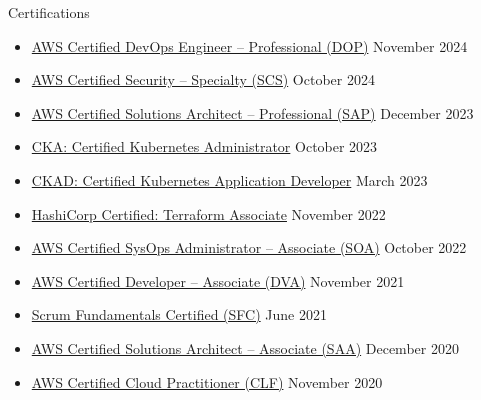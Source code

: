 \documentclass[a4paper]{article}
\newlength{\tabin}
\newlength{\secsep}
\newcommand{\lineunder}{\vspace*{-8pt}\\\hspace*{-6pt}\hrulefill\\\vspace*{-15pt}}
\newenvironment{tabbedsection}[1]{
  \begin{list}{}{
    \setlength{\itemsep}{0pt}
    \setlength{\labelsep}{0pt}
    \setlength{\labelwidth}{0pt}
    \setlength{\leftmargin}{\tabin}
    \setlength{\rightmargin}{\tabin}
    \setlength{\listparindent}{0pt}
    \setlength{\parsep}{0pt}
    \setlength{\parskip}{0pt}
    \setlength{\partopsep}{0pt}
    \setlength{\topsep}{#1}
  }
  \item[]
}{\end{list}}
\newenvironment{resume_section}[1]{
  \filbreak
  \vspace{2\secsep}
  \textsc{\large#1}
  \lineunder
  \begin{tabbedsection}{\secsep}
}{\end{tabbedsection}}
\newenvironment{subitems}{
  \renewcommand{\labelitemi}{-}
  \begin{itemize}
  \setlength{\labelsep}{1em}
}{\end{itemize}}
\begin{document}
\begin{resume_section}{Certifications}
  \begin{subitems}
    \item \href{https://www.credly.com/badges/8ccfcd37-58d8-4772-90a2-3d69231e4698}{AWS Certified DevOps Engineer -- Professional (DOP)} \hfill November 2024
    \item \href{https://www.credly.com/badges/d94cb58c-a9e4-44cd-80dd-2e551872609e}{AWS Certified Security -- Specialty (SCS)} \hfill October 2024
    \item \href{https://www.credly.com/badges/a3078ad1-cbc8-4726-9c7e-90731da1a1b7}{AWS Certified Solutions Architect -- Professional (SAP)} \hfill December 2023
    \item \href{https://www.credly.com/badges/0e2803d2-eb45-4143-ae3c-6d35009256be}{CKA: Certified Kubernetes Administrator} \hfill October 2023
    \item \href{https://www.credly.com/badges/4a65defc-6caa-46cc-bec3-2aed6984ab89}{CKAD: Certified Kubernetes Application Developer} \hfill March 2023
    \item \href{https://www.credly.com/badges/26043bb9-cca6-4c6c-80ae-51a4ef85da84}{HashiCorp Certified: Terraform Associate} \hfill November 2022
    \item \href{https://www.credly.com/badges/849a2bb2-2a38-46ad-9352-613da643d83a}{AWS Certified SysOps Administrator -- Associate (SOA)} \hfill October 2022
    \item \href{https://www.credly.com/badges/4af15df4-f5b2-4d6b-b989-bb47e71c9986}{AWS Certified Developer -- Associate (DVA)} \hfill November 2021
    \item \href{https://www.scrumstudy.com/certification/verify?type=SFC&number=848920}{Scrum Fundamentals Certified (SFC)} \hfill June 2021
    \item \href{https://www.credly.com/badges/52a6f0ff-d46a-4d42-9bb1-ea2b7fb01526}{AWS Certified Solutions Architect -- Associate (SAA)} \hfill December 2020
    \item \href{https://www.credly.com/badges/488ba1a8-a95a-46f5-943b-c275bc7e6178}{AWS Certified Cloud Practitioner (CLF)} \hfill November 2020
  \end{subitems}
\end{resume_section}
\end{document}
